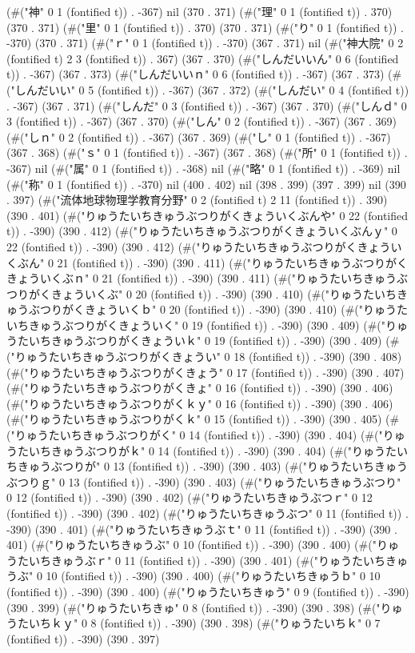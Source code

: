 (#("神" 0 1 (fontified t)) . -367) nil (370 . 371) (#("理" 0 1 (fontified t)) . 370) (370 . 371) (#("里" 0 1 (fontified t)) . 370) (370 . 371) (#("り" 0 1 (fontified t)) . -370) (370 . 371) (#("ｒ" 0 1 (fontified t)) . -370) (367 . 371) nil (#("神大院" 0 2 (fontified t) 2 3 (fontified t)) . 367) (367 . 370) (#("しんだいいん" 0 6 (fontified t)) . -367) (367 . 373) (#("しんだいいｎ" 0 6 (fontified t)) . -367) (367 . 373) (#("しんだいい" 0 5 (fontified t)) . -367) (367 . 372) (#("しんだい" 0 4 (fontified t)) . -367) (367 . 371) (#("しんだ" 0 3 (fontified t)) . -367) (367 . 370) (#("しんｄ" 0 3 (fontified t)) . -367) (367 . 370) (#("しん" 0 2 (fontified t)) . -367) (367 . 369) (#("しｎ" 0 2 (fontified t)) . -367) (367 . 369) (#("し" 0 1 (fontified t)) . -367) (367 . 368) (#("ｓ" 0 1 (fontified t)) . -367) (367 . 368) (#("所" 0 1 (fontified t)) . -367) nil (#("属" 0 1 (fontified t)) . -368) nil (#("略" 0 1 (fontified t)) . -369) nil (#("称" 0 1 (fontified t)) . -370) nil (400 . 402) nil (398 . 399) (397 . 399) nil (390 . 397) (#("流体地球物理学教育分野" 0 2 (fontified t) 2 11 (fontified t)) . 390) (390 . 401) (#("りゅうたいちきゅうぶつりがくきょういくぶんや" 0 22 (fontified t)) . -390) (390 . 412) (#("りゅうたいちきゅうぶつりがくきょういくぶんｙ" 0 22 (fontified t)) . -390) (390 . 412) (#("りゅうたいちきゅうぶつりがくきょういくぶん" 0 21 (fontified t)) . -390) (390 . 411) (#("りゅうたいちきゅうぶつりがくきょういくぶｎ" 0 21 (fontified t)) . -390) (390 . 411) (#("りゅうたいちきゅうぶつりがくきょういくぶ" 0 20 (fontified t)) . -390) (390 . 410) (#("りゅうたいちきゅうぶつりがくきょういくｂ" 0 20 (fontified t)) . -390) (390 . 410) (#("りゅうたいちきゅうぶつりがくきょういく" 0 19 (fontified t)) . -390) (390 . 409) (#("りゅうたいちきゅうぶつりがくきょういｋ" 0 19 (fontified t)) . -390) (390 . 409) (#("りゅうたいちきゅうぶつりがくきょうい" 0 18 (fontified t)) . -390) (390 . 408) (#("りゅうたいちきゅうぶつりがくきょう" 0 17 (fontified t)) . -390) (390 . 407) (#("りゅうたいちきゅうぶつりがくきょ" 0 16 (fontified t)) . -390) (390 . 406) (#("りゅうたいちきゅうぶつりがくｋｙ" 0 16 (fontified t)) . -390) (390 . 406) (#("りゅうたいちきゅうぶつりがくｋ" 0 15 (fontified t)) . -390) (390 . 405) (#("りゅうたいちきゅうぶつりがく" 0 14 (fontified t)) . -390) (390 . 404) (#("りゅうたいちきゅうぶつりがｋ" 0 14 (fontified t)) . -390) (390 . 404) (#("りゅうたいちきゅうぶつりが" 0 13 (fontified t)) . -390) (390 . 403) (#("りゅうたいちきゅうぶつりｇ" 0 13 (fontified t)) . -390) (390 . 403) (#("りゅうたいちきゅうぶつり" 0 12 (fontified t)) . -390) (390 . 402) (#("りゅうたいちきゅうぶつｒ" 0 12 (fontified t)) . -390) (390 . 402) (#("りゅうたいちきゅうぶつ" 0 11 (fontified t)) . -390) (390 . 401) (#("りゅうたいちきゅうぶｔ" 0 11 (fontified t)) . -390) (390 . 401) (#("りゅうたいちきゅうぶ" 0 10 (fontified t)) . -390) (390 . 400) (#("りゅうたいちきゅうぶｒ" 0 11 (fontified t)) . -390) (390 . 401) (#("りゅうたいちきゅうぶ" 0 10 (fontified t)) . -390) (390 . 400) (#("りゅうたいちきゅうｂ" 0 10 (fontified t)) . -390) (390 . 400) (#("りゅうたいちきゅう" 0 9 (fontified t)) . -390) (390 . 399) (#("りゅうたいちきゅ" 0 8 (fontified t)) . -390) (390 . 398) (#("りゅうたいちｋｙ" 0 8 (fontified t)) . -390) (390 . 398) (#("りゅうたいちｋ" 0 7 (fontified t)) . -390) (390 . 397) 